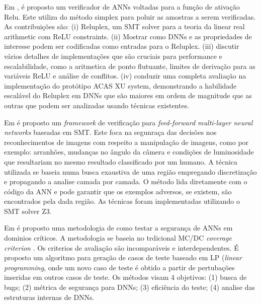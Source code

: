 Em \cite{reluplex}, é proposto um verificador de ANNs voltadas para a função de ativação Relu. Este utiliza do método simplex \cite{Bartels1971} para poluir as amostras a serem verificadas. As contribuições são: (i) Reluplex, um SMT solver para a teoria da linear real arithmetic com ReLU constraints. (ii) Mostrar como DNNs e as propriedades de interesse podem ser codificadas como entradas para o Reluplex. (iii) discutir vários detalhes de implementações que são cruciais para performance e escalabilidade, como a aritmetica de ponto flutuante, limites de derivação para as variáveis ReLU e análise de conflitos. (iv) conduzir uma completa avaliação na implementação do protótipo ACAS XU system, demonstrando a habilidade escalável do Reluplex em DNNs que são maiores em ordem de magnitude que as outras que podem ser analizadas usando técnicas existentes.


 Em \cite{marta2016} é proposto um \textit{framework} de verificação para \textit{feed-forward multi-layer neural networks} baseadas em SMT. Este foca na segunraça das decisões nos reconhecimentos de imagens com respeito a manipulação de imagens, como por exemplo: arranhões, mudanças no ângulo da câmera e condições de luminosidade que resultariam no mesmo resultado classificado por um humano. A técnica utilizada se baseia numa busca exaustiva de uma região empregando discretização e propagando a analise camada por camada. O método lida diretamente com o código da ANN e pode garantir que os exemplos adversos, se existem, são encontrados pela dada região. As técnicas foram implementadas utilizando o SMT solver Z3\cite{z3}.
 
 Em \cite{kroening2018} é proposto uma metodologia de como testar a segurança de ANNs em dominios críticos. A metodologia se baseia no trdicional MC/DC \textit{coverage criterion} \cite{chang2007}. Os criterios de avaliação são incomparáveis e interdependentes. É proposto um algoritmo para geração de casos de teste baseado em LP (\textit{linear programming}, onde um novo caso de teste é obtido a partir de pertubações inseridas em outros casos de teste. Os métodos visam 4 objetivos: (1) busca de bugs; (2) métrica de segurança para DNNs; (3) eficiência do teste; (4) analise das estruturas internas de DNNs.
 
 
 
 
 
 